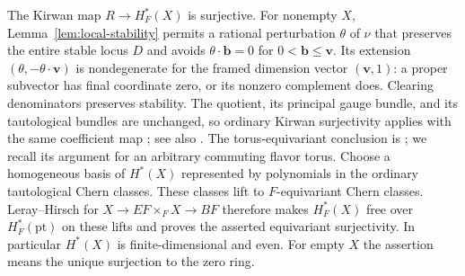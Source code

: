 The Kirwan map $R\to H_F^*(X)$ is surjective.  For nonempty $X$,
Lemma~\ref{lem:local-stability} permits a rational perturbation $\theta$
of $\nu$ that preserves the entire stable locus $D$ and avoids
$\theta\cdot\mathbf b=0$ for $0<\mathbf b\leq\mathbf v$.  Its extension
$(\theta,-\theta\cdot\mathbf v)$ is nondegenerate for the framed
dimension vector $(\mathbf v,1)$: a proper subvector has final
coordinate zero, or its nonzero complement does.  Clearing denominators
preserves stability.  The quotient, its principal gauge bundle, and its
tautological bundles are unchanged, so ordinary Kirwan surjectivity
applies with the same coefficient map
\cite[Definition~3.1 and Theorem~1.2]{MN18}; see also
\cite[Section~2.1]{DK25}.  The torus-equivariant conclusion is
\cite[Corollary~1.5]{MN18}; we recall its argument for an arbitrary
commuting flavor torus.  Choose a homogeneous basis of $H^*(X)$ represented by polynomials
in the ordinary tautological Chern classes.  These classes lift to
$F$-equivariant Chern classes.  Leray--Hirsch for
$X\to EF\times_F X\to BF$ therefore makes $H_F^*(X)$ free over
$H_F^*(\mathrm{pt})$ on these lifts and proves the asserted equivariant
surjectivity.  In particular $H^*(X)$ is finite-dimensional and even.
For empty $X$ the assertion means the unique surjection to the zero ring.
